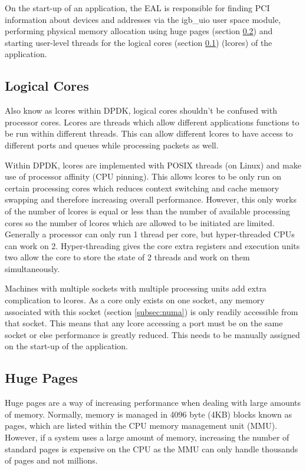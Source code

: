 \documentclass[final_report.tex]{subfiles}
\begin{document}
On the start-up of an application, the EAL is responsible for finding PCI information about devices and addresses via the igb\_uio user space module, performing physical memory allocation using huge pages (section \ref{subsec:hugepages}) and starting user-level threads for the logical cores (section \ref{subsec:logical_cores}) (lcores) of the application. 

\subsection{Logical Cores}
\label{subsec:logical_cores}
Also know as lcores within DPDK, logical cores shouldn't be confused with processor cores. Lcores are threads which allow different applications functions to be run within different threads. This can allow different lcores to have access to different ports and queues while processing packets as well.

Within DPDK, lcores are implemented with POSIX \cite{posix} threads (on Linux) and make use of processor affinity (CPU pinning)\cite{affinity}. This allows lcores to be only run on certain processing cores which reduces context switching and cache memory swapping and therefore increasing overall performance. However, this only works of the number of lcores is equal or less than the number of available processing cores so the number of lcores which are allowed to be initiated are limited. Generally a processor can only run 1 thread per core, but hyper-threaded CPUs can work on 2. Hyper-threading gives the core extra registers and execution units two allow the core to store the state of 2 threads and work on them simultaneously.

Machines with multiple sockets with multiple processing units add extra complication to lcores. As a core only exists on one socket, any memory associated with this socket (section \ref{subsec:numa}) is only readily accessible from that socket. This means that any lcore accessing a port must be on the same socket or else performance is greatly reduced. This needs to be manually assigned on the start-up of the application.

\newpage

\subsection{Huge Pages}
\label{subsec:hugepages}
Huge pages \cite{kernel}\cite{redhat} are a way of increasing performance when dealing with large amounts of memory. Normally, memory is managed in 4096 byte (4KB) blocks known as pages, which are listed within the CPU memory management unit (MMU). However, if a system uses a large amount of memory, increasing the number of standard pages is expensive on the CPU as the MMU can only handle thousands of pages and not millions.
\end{document}
